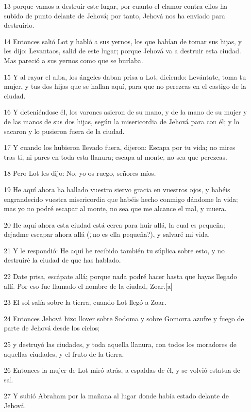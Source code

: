 13 porque vamos a destruir este lugar, por cuanto el clamor contra ellos ha subido de punto delante de Jehová; por tanto, Jehová nos ha enviado para destruirlo.

14 Entonces salió Lot y habló a sus yernos, los que habían de tomar sus hijas, y les dijo: Levantaos, salid de este lugar; porque Jehová va a destruir esta ciudad. Mas pareció a sus yernos como que se burlaba.

15 Y al rayar el alba, los ángeles daban prisa a Lot, diciendo: Levántate, toma tu mujer, y tus dos hijas que se hallan aquí, para que no perezcas en el castigo de la ciudad.

16 Y deteniéndose él, los varones asieron de su mano, y de la mano de su mujer y de las manos de sus dos hijas, según la misericordia de Jehová para con él; y lo sacaron y lo pusieron fuera de la ciudad.

17 Y cuando los hubieron llevado fuera, dijeron: Escapa por tu vida; no mires tras ti, ni pares en toda esta llanura; escapa al monte, no sea que perezcas.

18 Pero Lot les dijo: No, yo os ruego, señores míos.

19 He aquí ahora ha hallado vuestro siervo gracia en vuestros ojos, y habéis engrandecido vuestra misericordia que habéis hecho conmigo dándome la vida; mas yo no podré escapar al monte, no sea que me alcance el mal, y muera.

20 He aquí ahora esta ciudad está cerca para huir allá, la cual es pequeña; dejadme escapar ahora allá (¿no es ella pequeña?), y salvaré mi vida.

21 Y le respondió: He aquí he recibido también tu súplica sobre esto, y no destruiré la ciudad de que has hablado.

22 Date prisa, escápate allá; porque nada podré hacer hasta que hayas llegado allí. Por eso fue llamado el nombre de la ciudad, Zoar.[a]

23 El sol salía sobre la tierra, cuando Lot llegó a Zoar.

24 Entonces Jehová hizo llover sobre Sodoma y sobre Gomorra azufre y fuego de parte de Jehová desde los cielos;

25 y destruyó las ciudades, y toda aquella llanura, con todos los moradores de aquellas ciudades, y el fruto de la tierra.

26 Entonces la mujer de Lot miró atrás, a espaldas de él, y se volvió estatua de sal.

27 Y subió Abraham por la mañana al lugar donde había estado delante de Jehová.

